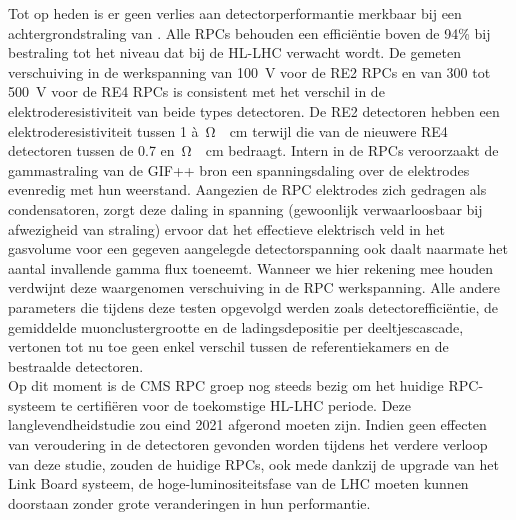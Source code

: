 	Tot op heden is er geen verlies aan detectorperformantie merkbaar bij een achtergrondstraling van . Alle RPCs behouden een efficiëntie boven de 94\% bij bestraling tot het niveau dat bij de HL-LHC verwacht wordt. De gemeten verschuiving in de werkspanning van \SI{100}{V} voor de RE2 RPCs en van 300 tot \SI{500}{V} voor de RE4 RPCs is consistent met het verschil in de elektroderesistiviteit van beide types detectoren. De RE2 detectoren hebben een elektroderesistiviteit tussen 1 à \,\si{\ohm\cdot cm} terwijl die van de nieuwere RE4 detectoren tussen de 0.7 en \,\si{\ohm\cdot cm} bedraagt. Intern in de RPCs veroorzaakt de gammastraling van de GIF++ bron een spanningsdaling over de elektrodes evenredig met hun weerstand. Aangezien de RPC elektrodes zich gedragen als condensatoren, zorgt deze daling in spanning (gewoonlijk verwaarloosbaar bij afwezigheid van straling) ervoor dat het effectieve elektrisch veld in het gasvolume voor een gegeven aangelegde detectorspanning ook daalt naarmate het aantal invallende gamma flux toeneemt. Wanneer we hier rekening mee houden verdwijnt deze waargenomen verschuiving in de RPC werkspanning. Alle andere parameters die tijdens deze testen opgevolgd werden zoals detectorefficiëntie, de gemiddelde muonclustergrootte en de ladingsdepositie per deeltjescascade, vertonen tot nu toe geen enkel verschil tussen de referentiekamers en de bestraalde detectoren.\\
	Op dit moment is de CMS RPC groep nog steeds bezig om het huidige RPC-systeem te certifiëren voor de toekomstige HL-LHC periode. Deze langlevendheidstudie zou eind 2021 afgerond moeten zijn. Indien geen effecten van veroudering in de detectoren gevonden worden tijdens het verdere verloop van deze studie, zouden de huidige RPCs, ook mede dankzij de upgrade van het Link Board systeem, de hoge-luminositeitsfase van de LHC moeten kunnen doorstaan zonder grote veranderingen in hun performantie.

\clearpage{\pagestyle{empty}\cleardoublepage}


